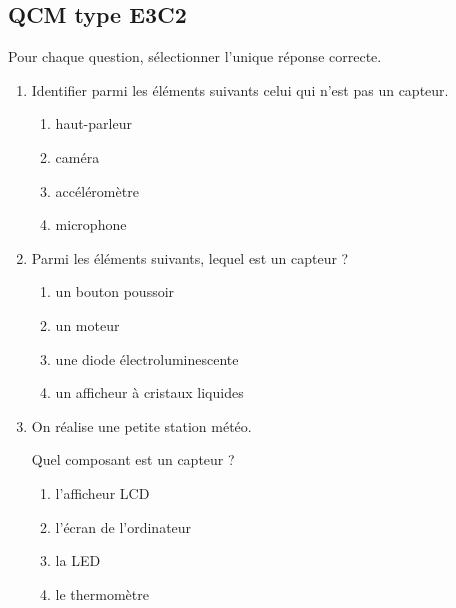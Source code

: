 \subsection{QCM type E3C2}


\begin{exerciceB2}{}
Pour chaque question, sélectionner l'unique réponse correcte.

\begin{enumerate}
	\item Identifier parmi les éléments suivants celui qui n'est pas un capteur.

\begin{multicols}{2}
\begin{enumerate}
	\item haut-parleur
	\item caméra
	\item accéléromètre
	\item microphone

\end{enumerate}
\end{multicols}
	
	\item Parmi les éléments suivants, lequel est un capteur ?
	
\begin{multicols}{2}
\begin{enumerate}
\item un bouton poussoir
\item un moteur
\item une diode électroluminescente
\item un afficheur à cristaux liquides

\end{enumerate}
\end{multicols}

\item On réalise une petite station météo.

Quel composant est un capteur ?

\begin{multicols}{2}
\begin{enumerate}
\item l'afficheur LCD
\item l'écran de l'ordinateur
\item la LED
\item le thermomètre
\end{enumerate}
\end{multicols}


\end{enumerate}
\end{exerciceB2}
